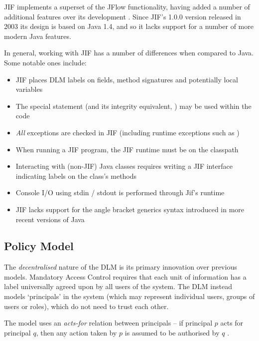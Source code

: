 JIF implements a superset of the JFlow functionality, having added a number of additional features over its development \cite{jifwebsite}. Since JIF's 1.0.0 version released in 2003 its design is based on Java 1.4, and so it lacks support for a number of more modern Java features.

In general, working with JIF has a number of differences when compared to Java. Some notable ones include:

\begin{itemize}
	\item JIF places DLM labels on fields, method signatures and potentially local variables
	
	\item The special  statement (and its integrity equivalent, ) may be used within the code
	
	\item \textit{All} exceptions are checked in JIF (including runtime exceptions such as )
	
	\item When running a JIF program, the JIF runtime must be on the classpath
	
	\item Interacting with (non-JIF) Java classes requires writing a JIF interface indicating labels on the class's methods
	
	\item Console I/O using stdin / stdout is performed through Jif's runtime
	
	\item JIF lacks support for the angle bracket generics syntax introduced in more recent versions of Java
\end{itemize}

\subsection{Policy Model}

The \textit{decentralised} nature of the DLM is its primary innovation over previous models. Mandatory Access Control requires that each unit of information has a label universally agreed upon by all users of the system. The DLM instead models `principals' in the system (which may represent individual users, groups of users or roles), which do not need to trust each other.

The model uses an \textit{acts-for} relation between principals -- if principal $ p $ acts for principal $ q $, then any action taken by $ p $ is assumed to be authorised by $ q $ \cite{myers2000dlm}.


